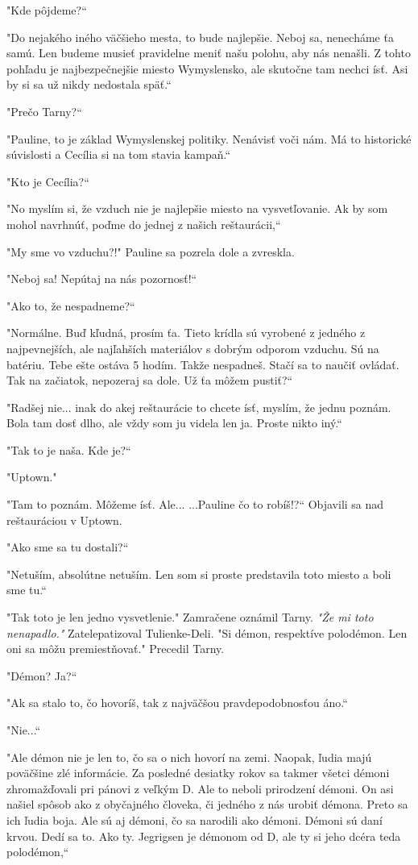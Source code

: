 \documentclass{book}
\begin{document}
"Kde pôjdeme?“

"Do nejakého iného väčšieho mesta, to bude najlepšie. Neboj sa, nenecháme ťa samú. Len budeme musieť pravidelne meniť našu polohu, aby nás nenašli. Z tohto pohľadu je najbezpečnejšie miesto Wymyslensko, ale skutočne tam nechci ísť. Asi by si sa už nikdy nedostala späť.“

"Prečo Tarny?“

"Pauline, to je základ Wymyslenskej politiky. Nenávisť voči nám. Má to historické súvislosti a Cecília si na tom stavia kampaň.“

"Kto je Cecília?“

"No myslím si, že vzduch nie je najlepšie miesto na vysvetľovanie. Ak by som mohol navrhnúť, poďme do jednej z našich reštaurácii,“

"My sme vo vzduchu?!"$ $ Pauline sa pozrela dole a zvreskla.

"Neboj sa! Nepútaj na nás pozornosť!“

"$ $Ako to, že nespadneme?“

"Normálne. Buď kľudná, prosím ťa. Tieto krídla sú vyrobené z jedného z najpevnejších, ale najľahších materiálov s dobrým odporom vzduchu. Sú na batériu. Tebe ešte ostáva 5 hodím. Takže nespadneš. Stačí sa to naučiť ovládať. Tak na začiatok, nepozeraj sa dole. Už ťa môžem pustiť?“

"Radšej nie... inak do akej reštaurácie to chcete ísť, myslím, že jednu poznám. Bola tam dosť dlho, ale vždy som ju videla len ja. Proste nikto iný.“

"Tak to je naša. Kde je?“

"$ $Uptown."$ $ 

"Tam to poznám. Môžeme ísť. Ale... ...Pauline čo to robíš!?“
Objavili sa nad reštauráciou v Uptown.

"$ $Ako sme sa tu dostali?“

"Netuším, absolútne netuším. Len som si proste predstavila toto miesto a boli sme tu.“

"Tak toto je len jedno vysvetlenie."$ $ Zamračene oznámil Tarny. \textit{"Že mi toto nenapadlo."} Zatelepatizoval Tulienke-Deli. "Si démon, respektíve polodémon. Len oni sa môžu premiestňovať."$ $ Precedil Tarny.

"Démon? Ja?“

"$ $Ak sa stalo to, čo hovoríš, tak z najväčšou pravdepodobnosťou áno.“

"Nie...“

"$ $Ale démon nie je len to, čo sa o nich hovorí na zemi. Naopak, ľudia majú poväčšine zlé informácie. Za posledné desiatky rokov sa takmer všetci démoni zhromažďovali pri pánovi z veľkým D. Ale to neboli prirodzení démoni. On asi našiel spôsob ako z obyčajného človeka, či jedného z nás urobiť démona. Preto sa ich ľudia boja. Ale sú aj démoni, čo sa narodili ako démoni. Démoni sú daní krvou. Dedí sa to. Ako ty. Jegrigsen je démonom od D, ale ty si jeho dcéra teda polodémon,“
\end{document}
